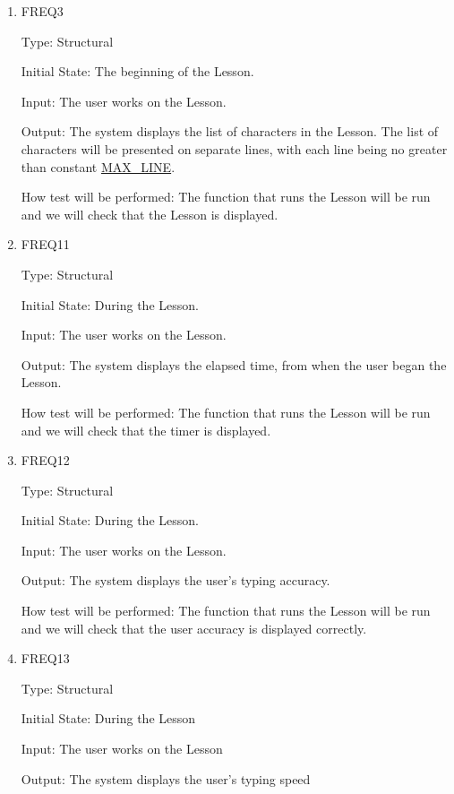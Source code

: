 \documentclass[12pt, titlepage]{article}
\begin{document}
\begin{enumerate}


\item{FREQ3\\}

Type: Structural
					
Initial State: The beginning of the Lesson.
					
Input: The user works on the Lesson.
					
Output: The system displays the list of characters in the Lesson. The list of characters will be presented on separate lines, with each line being no greater than constant \hyperref[symbols]{MAX\_LINE}.

					
How test will be performed: The function that runs the Lesson will be run and we will check that the Lesson is displayed.

\item{FREQ11\\}

Type: Structural
					
Initial State: During the Lesson.
					
Input: The user works on the Lesson.
					
Output: The system displays the elapsed time, from when the user began the Lesson.
					
How test will be performed:  The function that runs the Lesson will be run and we will check that the timer is displayed.

\item{FREQ12\\}

Type: Structural
					
Initial State: During the Lesson.
					
Input: The user works on the Lesson.
					
Output: The system displays the user's typing accuracy.
					
How test will be performed:  The function that runs the Lesson will be run and we will check that the user accuracy is displayed correctly. 

\item{FREQ13\\}

Type: Structural
					
Initial State: During the Lesson
					
Input: The user works on the Lesson
					
Output: The system displays the user's typing speed
					

\end{enumerate}
\end{document}
